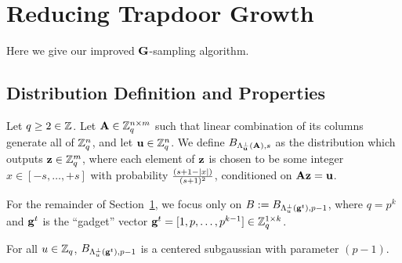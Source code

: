 
\section{Reducing Trapdoor Growth}
\label{sec:redtrapgrowth}

\newcommand{\sign}{\textsf{sign}}
\newcommand{\Exp}{\mathbb{E}}
Here we give our improved $\mathbf{G}$-sampling algorithm.

\subsection{Distribution Definition and Properties}
\label{sec:lemm-about-distr}

\begin{definition}\label{def:dist-def}
Let $q\geq 2 \in \mathbb{Z}$. Let $\mathbf{A} \in \mathbb{Z}_q^{n
  \times m}$ such that linear combination of its columns generate all
of $\mathbb{Z}_q^{n}$, and let $\mathbf{u} \in \mathbb{Z}_q^{n}$.
We define $B_{\Lambda^{\perp}_{\mathbf{u}}(\mathbf{A}),s}$ as the distribution which
outputs $\mathbf{z} \in \mathbb{Z}_q^m$, where each element of $\mathbf{z}$ is chosen to
be some integer $x \in [-s,\ldots,+s]$ with probability $\tfrac{(s+1-\lvert x\rvert)}{(s+1)^2}$, conditioned on
$\mathbf{A}\mathbf{z}=\mathbf{u}$. 
\end{definition}

For the remainder of Section~\ref{sec:redtrapgrowth}, we focus only on 
$B:=B_{\Lambda^{\perp}_{u}(\mathbf{g}^t),p-1}$, where  $q=p^k$ and $\mathbf{g}^{t}$ is the ``gadget''
vector $\mathbf{g}^{t}=[1,p,\ldots,p^{k-1}] \in \mathbb{Z}_q^{1 \times k}$.
\begin{lemma}\label{lem:centered-subgaussian}
For all $u \in \mathbb{Z}_q$,
$B_{\Lambda^{\perp}_{u}(\mathbf{g}^t),p-1}$ is a centered subgaussian with parameter
$(p-1)$.
\end{lemma}

